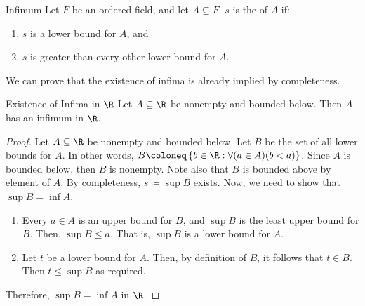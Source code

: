 \begin{dfnbox}{Infimum}{}
    Let $F$ be an ordered field, and let $A \subseteq F$. $s$ is the  of $A$ if:
    \begin{enumerate}[noitemsep]
        \item $s$ is a lower bound for $A$, and
        \item $s$ is greater than every other lower bound for $A$.
    \end{enumerate}
\end{dfnbox}

We can prove that the existence of infima is already implied by completeness.

\begin{thmbox}{Existence of Infima in $\R$}{}
    Let $A \subseteq \R$ be nonempty and bounded below. Then $A$ has an infimum in $\R$.
    \tcblower
    \begin{proof}
        Let $A \subseteq \R$ be nonempty and bounded below. Let $B$ be the set of all lower bounds for $A$. In other words, $B \coloneq \left\{ b \in \R : \forall(a \in A)(b < a) \right\}$. Since $A$ is bounded below, then $B$ is nonempty. Note also that $B$ is bounded above by element of $A$. By completeness, $s \coloneq \sup B$ exists. Now, we need to show that $\sup B = \inf A$.
        \begin{enumerate}
            \item Every $a \in A$ is an upper bound for $B$, and $\sup B$ is the least upper bound for $B$. Then, $\sup B \leq a$. That is, $\sup B$ is a lower bound for $A$.
            \item Let $t$ be a lower bound for $A$. Then, by definition of $B$, it follows that $t \in B$. Then $t \leq \sup B$ as required.
        \end{enumerate}
        Therefore, $\sup B = \inf A$ in $\R$.
    \end{proof}
\end{thmbox}

